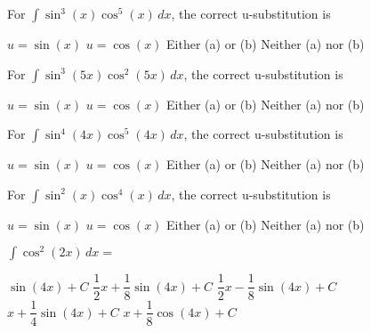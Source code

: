 \begin{questions}
    \question For $\int \sin^3 (x)\cos^5 (x) \, dx$, the correct u-substitution is \\

    \begin{oneparchoices}
        \choice $u = \sin (x)$ 
        \choice $u = \cos (x)$
        \choice Either (a) or (b)
        \choice Neither (a) nor (b)
    \end{oneparchoices} \par \horizontalline

    \question For $\int \sin^3 (5x)\cos^2 (5x) \, dx$, the correct u-substitution is \\

    \begin{oneparchoices}
        \choice $u = \sin (x)$ 
        \choice $u = \cos (x)$
        \choice Either (a) or (b)
        \choice Neither (a) nor (b)
    \end{oneparchoices} \par \horizontalline

    \question For $\int \sin^4 (4x)\cos^5 (4x) \, dx$, the correct u-substitution is \\

    \begin{oneparchoices}
        \choice $u = \sin (x)$ 
        \choice $u = \cos (x)$
        \choice Either (a) or (b)
        \choice Neither (a) nor (b)
    \end{oneparchoices} \par \horizontalline

    \question For $\int \sin^2 (x)\cos^4 (x) \, dx$, the correct u-substitution is \\

    \begin{oneparchoices}
        \choice $u = \sin (x)$ 
        \choice $u = \cos (x)$
        \choice Either (a) or (b)
        \choice Neither (a) nor (b)
    \end{oneparchoices} \par \horizontalline

    \question $\int \cos^2 (2x) \, dx = $ \\

    \begin{oneparchoices}
        \choice $\sin (4x) + C$
        \choice $\dfrac{1}{2}x + \dfrac{1}{8}\sin (4x) + C$
        \choice $\dfrac{1}{2}x - \dfrac{1}{8}\sin (4x) + C$ \\[11pt]
        \makebox[0.18\textwidth] \choice $x + \dfrac{1}{4}\sin (4x) + C$
        \makebox[0.22\textwidth] \choice $x + \dfrac{1}{8}\cos (4x) + C$
    \end{oneparchoices} \par \horizontalline


\end{questions}
